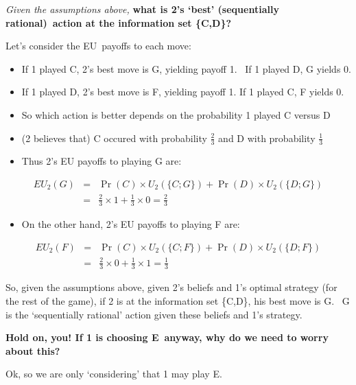 \documentclass{article}
\begin{document}
\bigskip

\textit{Given the assumptions above, }\textbf{what is 2's `best'
(sequentially rational)\ action at the information set \{C,D\}?}

Let's consider the EU\ payoffs to each move:

\begin{itemize}
\item If 1 played C, 2's best move is G, yielding payoff 1. \ If 1 played D,
G yields 0.

\item If 1 played D, 2's best move is F, yielding payoff 1. If 1 played C, F
yields 0.

\item So which action is better depends on the probability 1 played C versus
D

\item (2 believes that) C occured with probability $\frac{2}{3}$ and D with
probability $\frac{1}{3}$

\item Thus 2's EU payoffs to playing G are:
\end{itemize}

\begin{eqnarray*}
EU_{2}(G) &=&\Pr (C)\times U_{2}(\{C;G\})+\Pr (D)\times U_{2}(\{D;G\}) \\
&=&\frac{2}{3}\times 1+\frac{1}{3}\times 0=\frac{2}{3}
\end{eqnarray*}

\begin{itemize}
\item On the other hand, 2's EU payoffs to playing F are:
\end{itemize}

\begin{eqnarray*}
EU_{2}(F) &=&\Pr (C)\times U_{2}(\{C;F\})+\Pr (D)\times U_{2}(\{D;F\}) \\
&=&\frac{2}{3}\times 0+\frac{1}{3}\times 1=\frac{1}{3}
\end{eqnarray*}

So, given the assumptions above, given 2's beliefs and 1's optimal strategy
(for the rest of the game), if 2 is at the information set \{C,D\}, his best
move is G. \ G is the `sequentially rational' action given these beliefs and
1's strategy.

\bigskip

\textbf{Hold on, you! If 1 is choosing E\ anyway, why do we need to worry
about this?}

Ok, so we are only `considering' that 1 may play E. \
\end{document}
